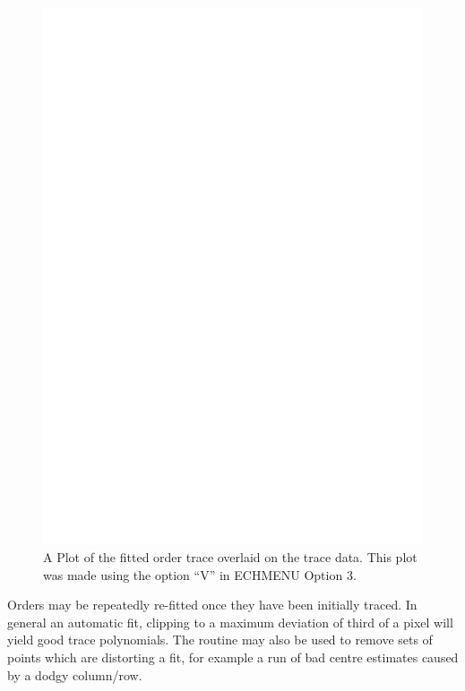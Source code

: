 \documentclass[twoside,11pt]{article}
\renewcommand{\_}{\texttt{\symbol{95}}}
\newcommand{\sunspec}[2]{#1}
\newcommand{\sunspec}[2]{#2}
\begin{document}
\begin{figure}
\begin{center}
\includegraphics[width=\textwidth]{sun152_03.eps}

\parbox{140mm}{
\caption{A Plot of the fitted order trace overlaid on the trace data.
This plot was made using the option ``V'' in ECHMENU Option 3.}
\label{fi_tracefit}
}
\end{center}
\end{figure}

Orders may be repeatedly re-fitted once they have been initially traced.
In general an automatic fit, clipping to a maximum deviation of third of
a pixel will yield good trace polynomials. The routine may also be used
to remove sets of points which are distorting a fit, for example a run
of bad centre estimates caused by a dodgy column/row.
\end{document}
